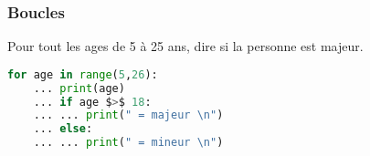 \documentclass{beamer}
\begin{document}
\begin{frame}[fragile]
    \frametitle{Boucles}

    Pour tout les ages de 5 à 25 ans, dire si la personne est majeur.
    \begin{lstlisting}[language=python]
    for age in range(5,26):
    ... print(age)
    ... if age $>$ 18:
    ... ... print(" = majeur \n")
    ... else:
    ... ... print(" = mineur \n")
    \end{lstlisting}
\end{frame}
\end{document}
